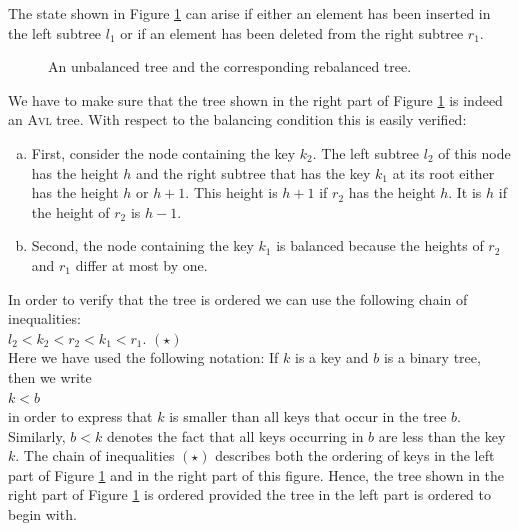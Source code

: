 \begin{enumerate}
      The state shown in Figure \ref{fig:casell} can arise if either an element has been inserted
      in the left subtree $l_1$ or if an element has been deleted from the right subtree  $r_1$.

      \begin{figure}[!ht]
        \centering
        \caption{An unbalanced tree and the corresponding rebalanced tree.}
        \label{fig:casell}
      \end{figure}
      We have to make sure that the tree shown in the right part of Figure
      \ref{fig:casell} is indeed an  \textsc{Avl} tree. With respect to the balancing condition this is
      easily verified:
      \begin{enumerate}[(a)]
      \item First, consider the node containing the key $k_2$.
            The left subtree $l_2$ of this node has the height $h$ and the right subtree
            that has the key $k_1$ at its root either has the height $h$ or $h+1$.
            This height is $h+1$ if $r_2$ has the height $h$.  It is $h$ if the height of $r_2$ is $h-1$.
      \item Second, the node containing the key $k_1$ is balanced because the heights of $r_2$ and $r_1$ differ
            at most by one.
      \end{enumerate}
      In order to verify that the tree is ordered we can use the following chain of inequalities:
      \\[0.2cm]
      \hspace*{1.3cm}
      $l_2 < k_2 < r_2 < k_1 < r_1$. 
      \hspace*{\fill} $(\star)$
      \\[0.2cm]
      Here we have used the following notation: If  $k$ is a key and  $b$ is a binary tree, then we write \\[0.2cm]
      \hspace*{1.3cm} $k < b$ \\[0.2cm]
      in order to express that  $k$ is smaller than all keys that occur in the tree  $b$.
      Similarly,  $b < k$ denotes the fact that all keys occurring in $b$ are less than the key
      $k$.  The chain of inequalities $(\star)$ describes both the ordering of keys in the left part of Figure
      \ref{fig:casell} and in the right part of this figure.  Hence, the tree shown in the right
      part of Figure \ref{fig:casell} is ordered provided the tree in the left part is ordered to begin with.

\end{enumerate}
